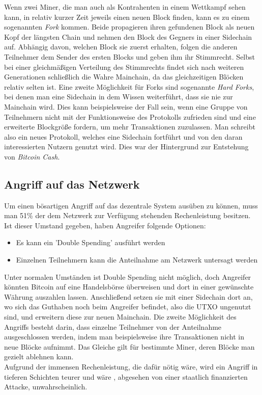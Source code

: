 Wenn zwei Miner, die man auch als Kontrahenten in einem Wettkampf sehen kann, in relativ kurzer Zeit jeweils einen neuen Block finden, kann es zu einem sogenannten \emph{Fork} kommen. Beide propagieren ihren gefundenen Block als neuen Kopf der längsten Chain und nehmen den Block des Gegners in einer Sidechain auf. Abhängig davon, welchen Block sie zuerst erhalten, folgen die anderen Teilnehmer dem Sender des ersten Blocks und geben ihm ihr Stimmrecht. Selbst bei einer gleichmäßigen Verteilung des Stimmrechts findet sich nach weiteren Generationen schließlich die Wahre Mainchain, da das gleichzeitigen Blöcken relativ selten ist.
Eine zweite Möglichkeit für Forks sind sogenannte \emph{Hard Forks}, bei denen man eine Sidechain in dem Wissen weiterführt, dass sie nie zur Mainchain wird. Dies kann beispielsweise der Fall sein, wenn eine Gruppe von Teilnehmern nicht mit der Funktionsweise des Protokolls zufrieden sind und eine erweiterte Blockgröße fordern, um mehr Transaktionen zuzulassen. Man schreibt also ein neues Protokoll, welches eine Sidechain fortführt und von den daran interessierten Nutzern genutzt wird. Dies war der Hintergrund zur Entstehung von \emph{Bitcoin Cash}.
\subsection{Angriff auf das Netzwerk}
Um einen bösartigen Angriff auf das dezentrale System ausüben zu können, muss man 51\% der dem Netzwerk zur Verfügung stehenden Rechenleistung besitzen. Ist dieser Umstand gegeben, haben Angreifer folgende Optionen:
\begin{itemize}
	\item Es kann ein 'Double Spending' ausführt werden
	\item Einzelnen Teilnehmern kann die Anteilnahme am Netzwerk untersagt werden
\end{itemize}
Unter normalen Umständen ist Double Spending nicht möglich, doch Angreifer könnten Bitcoin auf eine Handelsbörse überweisen und dort in einer gewünschte Währung auszahlen lassen. Anschließend setzen sie mit einer Sidechain dort an, wo sich das Guthaben noch beim Angreifer befindet, also die UTXO ungenutzt sind, und erweitern diese zur neuen Mainchain.
Die zweite Möglichkeit des Angriffs besteht darin, dass einzelne Teilnehmer von der Anteilnahme ausgeschlossen werden, indem man beispielsweise ihre Transaktionen nicht in neue Blöcke aufnimmt. Das Gleiche gilt für bestimmte Miner, deren Blöcke man gezielt ablehnen kann.\\

Aufgrund der immensen Rechenleistung, die dafür nötig wäre, wird ein Angriff in tieferen Schichten teurer und wäre , abgesehen von einer staatlich finanzierten Attacke, unwahrscheinlich.
